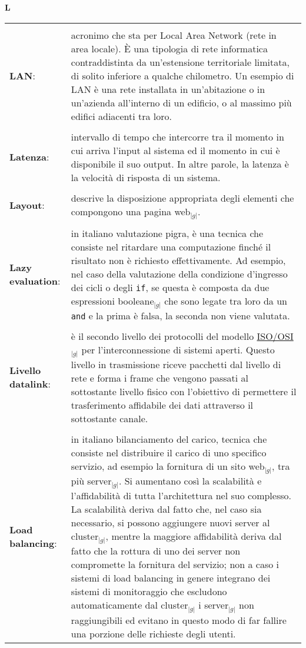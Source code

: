 \hfill\Huge{\textbf{L}}\\
\normalsize
\label{tabVers}
	\begin{longtable}{p{} p{}} 
	    \toprule
	    \\
	    \textbf{LAN}:		&	acronimo che sta per Local Area Network (rete in area locale). \`E una tipologia di rete informatica contraddistinta da un’estensione territoriale limitata, di solito inferiore a qualche chilometro. 
						Un esempio di LAN è una rete installata in un’abitazione o in un’azienda all’interno di un edificio, o al massimo più edifici adiacenti tra loro.\\
	    \\
	    \textbf{Latenza}:		&	intervallo di tempo che intercorre tra il momento in cui arriva l’input al sistema ed il momento in cui è disponibile il suo output.
						In altre parole, la latenza è la velocità di risposta di un sistema.\\
	    \\
	    \textbf{Layout}:		&	descrive la disposizione appropriata degli elementi che compongono una pagina web$_{|g|}$.\\
	    \\
	    \textbf{Lazy evaluation}:	&	in italiano valutazione pigra, è una tecnica che consiste nel ritardare una computazione finché il risultato non è richiesto effettivamente. Ad esempio, nel caso della valutazione 
						della condizione d’ingresso dei cicli o degli \texttt{if}, se questa è composta da due espressioni booleane$_{|g|}$ che sono legate tra loro da un \texttt{and} e la prima è falsa, la seconda non viene valutata.\\
	    \\
	    \textbf{Livello datalink}: 	&	è il secondo livello dei protocolli del modello \underline{ISO/OSI}$_{|g|}$ per l'interconnessione di sistemi aperti. Questo livello in trasmissione riceve pacchetti dal livello di rete e forma i frame che 
						vengono passati al sottostante livello fisico con l'obiettivo di permettere il trasferimento affidabile dei dati attraverso il sottostante canale.\\
	    \\
	    \textbf{Load balancing}:	&	in italiano bilanciamento del carico, tecnica che consiste nel distribuire il carico di uno specifico servizio, ad esempio la fornitura di un sito web$_{|g|}$, tra più server$_{|g|}$. Si aumentano così la 
						scalabilità e l'affidabilità di tutta l’architettura nel suo complesso. La scalabilità deriva dal fatto che, nel caso sia necessario, si possono aggiungere nuovi server al cluster$_{|g|}$, mentre la 
						maggiore affidabilità deriva dal fatto che la rottura di uno dei server non compromette la fornitura del servizio; non a caso i sistemi di load balancing in genere integrano dei sistemi di monitoraggio 
						che escludono automaticamente dal cluster$_{|g|}$ i server$_{|g|}$ non raggiungibili ed evitano in questo modo di far fallire una porzione delle richieste degli utenti.\\
	\end{longtable}
\newpage